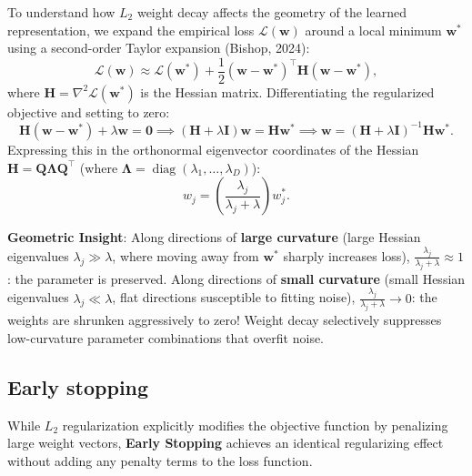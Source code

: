 To understand how $L_2$ weight decay affects the geometry of the learned representation, we expand the empirical loss $\mathcal{L}(\mathbf{w})$ around a local minimum $\mathbf{w}^*$ using a second-order Taylor expansion (Bishop, 2024):
\begin{equation}
\mathcal{L}(\mathbf{w}) \approx \mathcal{L}(\mathbf{w}^*) + \frac{1}{2}(\mathbf{w} - \mathbf{w}^*)^\top \mathbf{H} (\mathbf{w} - \mathbf{w}^*),
\end{equation}
where $\mathbf{H} = \nabla^2 \mathcal{L}(\mathbf{w}^*)$ is the Hessian matrix. Differentiating the regularized objective and setting to zero:
\begin{equation}
\mathbf{H}(\mathbf{w} - \mathbf{w}^*) + \lambda \mathbf{w} = \mathbf{0} \implies (\mathbf{H} + \lambda \mathbf{I})\mathbf{w} = \mathbf{H}\mathbf{w}^* \implies \mathbf{w} = (\mathbf{H} + \lambda \mathbf{I})^{-1} \mathbf{H} \mathbf{w}^*.
\end{equation}
Expressing this in the orthonormal eigenvector coordinates of the Hessian $\mathbf{H} = \mathbf{Q} \boldsymbol{\Lambda} \mathbf{Q}^\top$ (where $\boldsymbol{\Lambda} = \operatorname{diag}(\lambda_1, \dots, \lambda_D)$):
\begin{equation}
w_j = \left( \frac{\lambda_j}{\lambda_j + \lambda} \right) w_j^*.
\label{eq:hessian_weight_shrinkage}
\end{equation}

\textbf{Geometric Insight}: Along directions of \textbf{large curvature} (large Hessian eigenvalues $\lambda_j \gg \lambda$, where moving away from $\mathbf{w}^*$ sharply increases loss), $\frac{\lambda_j}{\lambda_j + \lambda} \approx 1$: the parameter is preserved. Along directions of \textbf{small curvature} (small Hessian eigenvalues $\lambda_j \ll \lambda$, flat directions susceptible to fitting noise), $\frac{\lambda_j}{\lambda_j + \lambda} \to 0$: the weights are shrunken aggressively to zero! Weight decay selectively suppresses low-curvature parameter combinations that overfit noise.

\subsection{Early stopping}
\label{sec:early_stopping_bishop}

While $L_2$ regularization explicitly modifies the objective function by penalizing large weight vectors, \textbf{Early Stopping} achieves an identical regularizing effect without adding any penalty terms to the loss function.

